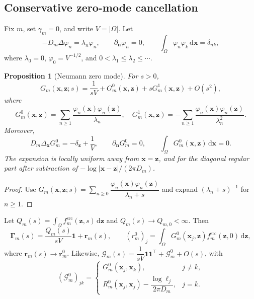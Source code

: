 \documentclass[pdflatex,sn-mathphys-num]{sn-jnl}
\numberwithin{equation}{section}
\theoremstyle{thmstyleone}%
\newtheorem{proposition}[theorem]{Proposition}
\theoremstyle{definition}
\theoremstyle{remark}
\begin{document}
\begin{appendices}
\section{Conservative zero-mode cancellation}
\label{app:zeromode}

Fix $m$, set $\gamma_m=0$, and write $V=|\Omega|$. Let
\[
-D_m\Delta\varphi_n=\lambda_n\varphi_n,\qquad
\partial_{\mathbf n}\varphi_n=0,\qquad
\int_\Omega\varphi_n\varphi_k\,\mathrm d\mathbf x=\delta_{nk},
\]
where $\lambda_0=0$, $\varphi_0=V^{-1/2}$, and
$0<\lambda_1\leq\lambda_2\leq\cdots$.

\begin{proposition}[Neumann zero mode]
\label{prop:app_neumann_zero_mode}
For $s>0$,
\begin{equation*}
G_m(\mathbf x,\mathbf z;s)=\frac1{sV}+G_m^0(\mathbf x,\mathbf z)
+sG_m^1(\mathbf x,\mathbf z)+O(s^2),
\end{equation*}
where
\[
G_m^0(\mathbf x,\mathbf z)=\sum_{n\geq1}\frac{\varphi_n(\mathbf x)\varphi_n(\mathbf z)}{\lambda_n},\quad
G_m^1(\mathbf x,\mathbf z)=-\sum_{n\geq1}\frac{\varphi_n(\mathbf x)\varphi_n(\mathbf z)}{\lambda_n^2}.
\]
Moreover,
\begin{equation}
D_m\Delta_{\mathbf x}G_m^0=-\delta_{\mathbf z}+\frac1V,\qquad
\partial_{\mathbf n}G_m^0=0,\qquad
\int_\Omega G_m^0(\mathbf x,\mathbf z)\,\mathrm d\mathbf x=0.
\label{eq:app_pseudogreen_problem}
\end{equation}
The expansion is locally uniform away from $\mathbf x=\mathbf z$, and for the
diagonal regular part after subtraction of
$-\log|\mathbf x-\mathbf z|/(2\pi D_m)$.
\end{proposition}

\begin{proof}
Use
$G_m(\mathbf x,\mathbf z;s)=\sum_{n\geq0}
\dfrac{\varphi_n(\mathbf x)\varphi_n(\mathbf z)}{\lambda_n+s}$
and expand $(\lambda_n+s)^{-1}$ for $n\geq1$.
\end{proof}

Let
$Q_m(s)=\int_\Omega f_m^{\mathrm{src}}(\mathbf z,s)\,\mathrm d\mathbf z$ and $Q_m(s)\longrightarrow Q_{m,0}<\infty$.
Then
\begin{equation}
\bm\Gamma_m(s)=\frac{Q_m(s)}{sV}\mathbf1+\bm r_m(s),
\qquad
(r_m^0)_j=\int_\Omega G_m^0(\mathbf x_j,\mathbf z)
f_m^{\mathrm{src}}(\mathbf z,0)\,\mathrm d\mathbf z,
\label{eq:app_forcing_decomposition}
\end{equation}
where $\bm r_m(s)\to\bm r_m^0$. Likewise,
$\bm{\mathcal G}_m(s)=\dfrac1{sV}\mathbf1\mathbf1^\top
+\bm{\mathcal G}_m^0+O(s)$,
with
\[
(\bm{\mathcal G}_m^0)_{jk}=
\begin{cases}
G_m^0(\mathbf x_j,\mathbf x_k),&j\ne k,\\[1mm]
R_m^0(\mathbf x_j,\mathbf x_j)
-\dfrac{\log\ell_j}{2\pi D_m},&j=k.
\end{cases}
\]


\end{appendices}
\end{document}
